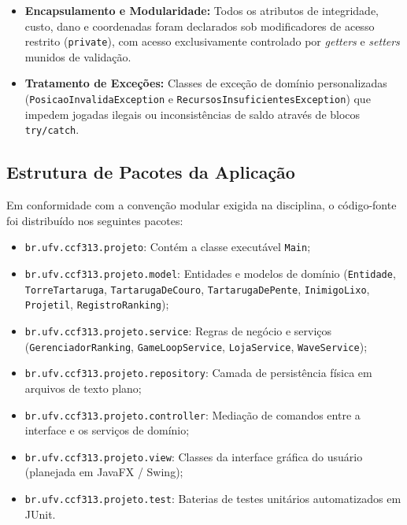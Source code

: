 \documentclass[11pt,a4paper]{article}
\begin{document}
\begin{itemize}
\begin{itemize}
        \item \textit{Sobrecarga (\textit{Overload}):} Construtores com assinaturas e listas de parâmetros distintas em \texttt{Entidade} (\texttt{Entidade()} padrão versus \texttt{Entidade(posX, posY)} parametrizado), permitindo instanciação flexível no catálogo de compras antes do posicionamento em malha.
    \end{itemize}
    \item \textbf{Encapsulamento e Modularidade:} Todos os atributos de integridade, custo, dano e coordenadas foram declarados sob modificadores de acesso restrito (\texttt{private}), com acesso exclusivamente controlado por \textit{getters} e \textit{setters} munidos de validação.
    \item \textbf{Tratamento de Exceções:} Classes de exceção de domínio personalizadas (\texttt{PosicaoInvalidaException} e \texttt{RecursosInsuficientesException}) que impedem jogadas ilegais ou inconsistências de saldo através de blocos \texttt{try/catch}.
\end{itemize}

\subsection*{Estrutura de Pacotes da Aplicação}
Em conformidade com a convenção modular exigida na disciplina, o código-fonte foi distribuído nos seguintes pacotes:
\begin{itemize}
    \item \texttt{br.ufv.ccf313.projeto}: Contém a classe executável \texttt{Main};
    \item \texttt{br.ufv.ccf313.projeto.model}: Entidades e modelos de domínio (\texttt{Entidade}, \texttt{TorreTartaruga}, \texttt{TartarugaDeCouro}, \texttt{TartarugaDePente}, \texttt{InimigoLixo}, \texttt{Projetil}, \texttt{RegistroRanking});
    \item \texttt{br.ufv.ccf313.projeto.service}: Regras de negócio e serviços (\texttt{GerenciadorRanking}, \texttt{GameLoopService}, \texttt{LojaService}, \texttt{WaveService});
    \item \texttt{br.ufv.ccf313.projeto.repository}: Camada de persistência física em arquivos de texto plano;
    \item \texttt{br.ufv.ccf313.projeto.controller}: Mediação de comandos entre a interface e os serviços de domínio;
    \item \texttt{br.ufv.ccf313.projeto.view}: Classes da interface gráfica do usuário (planejada em JavaFX / Swing);
    \item \texttt{br.ufv.ccf313.projeto.test}: Baterias de testes unitários automatizados em JUnit.
\end{itemize}
\end{document}
